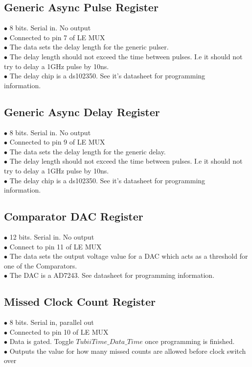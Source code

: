 \documentclass[11pt,a4paper]{article}
\begin{document}
\subsection{Generic Async Pulse Register}
$\bullet$ 8 bits. Serial in. No output\\
$\bullet$ Connected to pin 7 of LE MUX \\
$\bullet$ The data sets the delay length for the generic pulser. \\
$\bullet$ The delay length should not exceed the time between pulses. I.e it should not try to delay a 1GHz pulse by 10ns.\\
$\bullet$ The delay chip is a ds102350. See it's datasheet for programming\\ information.\\
\subsection{Generic Async Delay Register}
$\bullet$ 8 bits. Serial in. No output \\
$\bullet$ Connected to pin 9 of LE MUX \\
$\bullet$ The data sets the delay length for the generic delay. \\
$\bullet$ The delay length should not exceed the time between pulses. I.e it should not try to delay a 1GHz pulse by 10ns.\\
$\bullet$ The delay chip is a ds102350. See it's datasheet for programming\\ information.\\
\subsection{Comparator DAC Register}
$\bullet$ 12 bits. Serial in. No output \\
$\bullet$ Connect to pin 11 of LE MUX \\
$\bullet$ The data sets the output voltage value for a DAC which acts as a threshold for one of the Comparators. \\
$\bullet$ The DAC is a AD7243. See datasheet for programming information.\\
\subsection{Missed Clock Count Register}
$\bullet$ 8 bits. Serial in, parallel out \\
$\bullet$ Connected to pin 10 of LE MUX \\
$\bullet$ Data is gated. Toggle $TubiiTime\_Data\_Time$ once programming is finished.\\
$\bullet$ Outputs the value for how many missed counts are allowed before clock switch over \\
\end{document}
